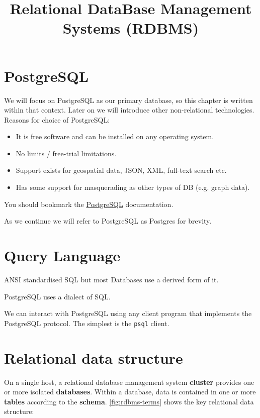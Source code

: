\documentclass[slides]{pgnotes}
\title{Relational DataBase Management Systems (RDBMS)}
\begin{document}
\maketitle

\section{PostgreSQL}\label{sec:postgresql}

We will focus on PostgreSQL as our primary database, so this chapter is written within that context.
Later on we will introduce other non-relational technologies.
Reasons for choice of PostgreSQL:

\begin{itemize}
\item
  It is free software and can be installed on any operating system.
\item
  No limits / free-trial limitations.
\item
  Support exists for geospatial data, JSON, XML, full-text search etc.
\item
  Has some support for masquerading as other types of DB (e.g. graph data).
\end{itemize}

You should bookmark the
\href{https://www.postgresql.org/docs/13/}{PostgreSQL} documentation.

As we continue we will refer to PostgreSQL as Postgres for brevity.


\section{Query Language}

ANSI standardised SQL but most Databases use a derived form of it. 

PostgreSQL uses a dialect of SQL.

We can interact with PostgreSQL using any client program that implements the PostgreSQL protocol.
The simplest is the \texttt{psql} client. 


\section{Relational data structure}

On a single host, a relational database management system \textbf{cluster} provides one or more isolated \textbf{databases}.
Within a database, data is contained in one or more \textbf{tables} according to the \textbf{schema}.
\autoref{fig:rdbms-terms} shows the key relational data structure:
\end{document}
